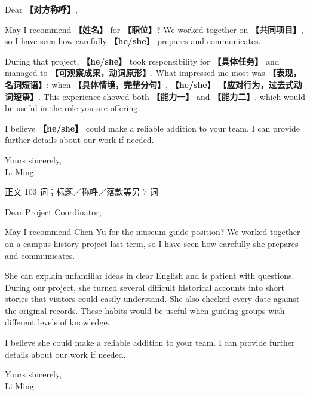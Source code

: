 \documentclass[11pt,a4paper,fontset=macnew]{ctexart}
\newenvironment{writing}{\begingroup\fontsize{10.5}{13.5}\selectfont\setlength{\parskip}{3pt}}{\par\endgroup}
\newenvironment{example}{\begingroup\fontsize{11}{14.3}\selectfont\setlength{\parskip}{4pt}}{\par\endgroup}
\begin{document}
\par\vspace{4pt}{\bfseries 可替换模板}\par\nopagebreak
\begin{writing}
\noindent Dear {\bfseries 【对方称呼】},\par
May I recommend {\bfseries 【姓名】} for {\bfseries 【职位】}? We worked together on {\bfseries 【共同项目】}, so I have seen how carefully {\bfseries 【he/she】} prepares and communicates.

During that project, {\bfseries 【he/she】} took responsibility for {\bfseries 【具体任务】} and managed to {\bfseries 【可观察成果，动词原形】}. What impressed me most was {\bfseries 【表现，名词短语】}: when {\bfseries 【具体情境，完整分句】}, {\bfseries 【he/she】} {\bfseries 【应对行为，过去式动词短语】}. This experience showed both {\bfseries 【能力一】} and {\bfseries 【能力二】}, which would be useful in the role you are offering.

I believe {\bfseries 【he/she】} could make a reliable addition to your team. I can provide further details about our work if needed.

\noindent Yours sincerely,\\Li Ming\par
\end{writing}
\par\vspace{4pt}{\bfseries 完整套用示例}\par\nopagebreak
{\small 正文 103 词；标题／称呼／落款等另 7 词}\par
\begin{example}
\noindent Dear Project Coordinator,\par
May I recommend Chen Yu for the museum guide position? We worked together on a campus history project last term, so I have seen how carefully she prepares and communicates.

She can explain unfamiliar ideas in clear English and is patient with questions. During our project, she turned several difficult historical accounts into short stories that visitors could easily understand. She also checked every date against the original records. These habits would be useful when guiding groups with different levels of knowledge.

I believe she could make a reliable addition to your team. I can provide further details about our work if needed.

\noindent Yours sincerely,\\Li Ming\par
\end{example}
\end{document}
